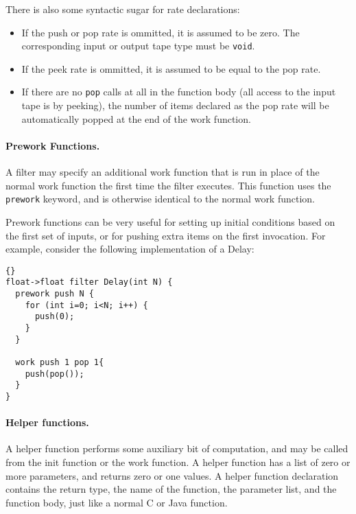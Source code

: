 \documentclass[11pt]{article}
\begin{document}
\noindent There is also some syntactic sugar for rate declarations:

\begin{itemize}

\item If the push or pop rate is ommitted, it is assumed to be zero.
The corresponding input or output tape type must be \lstinline|void|.

\item If the peek rate is ommitted, it is assumed to be equal to the
pop rate.

\item If there are no \lstinline|pop| calls at all in the function
body (all access to the input tape is by peeking), the number of items
declared as the pop rate will be automatically popped at the end of
the work function.

\end{itemize}

\paragraph{Prework Functions.}  A filter may specify an additional work 
function that is run in place of the normal work function the first
time the filter executes.  This function uses the \lstinline|prework|
keyword, and is otherwise identical to the normal work function.

Prework functions can be very useful for setting up initial conditions
based on the first set of inputs, or for pushing extra items on the
first invocation.  For example, consider the following implementation
of a Delay:

\begin{lstlisting}{}
float->float filter Delay(int N) {
  prework push N {
    for (int i=0; i<N; i++) {
      push(0);
    }
  }

  work push 1 pop 1{
    push(pop());
  }
}
\end{lstlisting}

\paragraph{Helper functions.}  A helper function performs some
auxiliary bit of computation, and may be called from the init function
or the work function.  A helper function has a list of zero or more
parameters, and returns zero or one values.  A helper function
declaration contains the return type, the name of the function, the
parameter list, and the function body, just like a normal C or Java
function.
\end{document}
